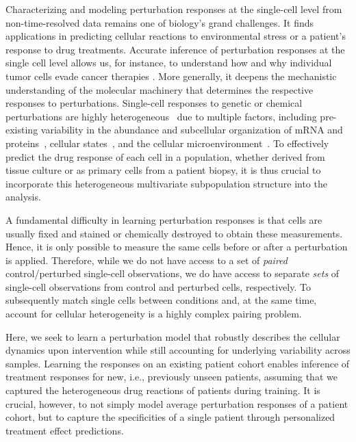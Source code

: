 Characterizing and modeling perturbation responses at the single-cell level from non-time-resolved data remains one of biology's grand challenges. It finds applications in predicting cellular reactions to environmental stress or a patient's response to drug treatments. Accurate inference of perturbation responses at the single cell level allows us, for instance, to understand how and why individual tumor cells evade cancer therapies \citep{frangieh2021multimodal}. More generally, it deepens the mechanistic understanding of the molecular machinery that determines the respective responses to perturbations. Single-cell responses to genetic or chemical perturbations are  highly heterogeneous~\citep{liberali2014hierarchical} due to multiple factors, including pre-existing variability in the abundance and subcellular organization of mRNA and proteins~\citep{battich2013image, battich2015control, gut2018multiplexed, shaffer2017rare}, cellular states~\citep{kramer2019cellular}, and the cellular microenvironment~\citep{snijder2009population}. To effectively predict the drug response of each cell in a  population, whether derived from tissue culture or as primary cells from a patient biopsy, it is thus crucial to incorporate this heterogeneous multivariate subpopulation structure into the analysis.

 A fundamental difficulty in learning perturbation responses is that cells are usually fixed and stained or chemically destroyed to obtain these measurements. Hence, it is only possible to measure the same cells  before or after a perturbation is applied. 
Therefore, while we do not have access to a set of {\em paired} control/perturbed single-cell observations, we do have access to separate \emph{sets} of single-cell observations from control and perturbed cells, respectively. To subsequently match single cells between conditions and, at the same time, account for cellular heterogeneity is a highly complex pairing problem.

Here, we seek to learn a perturbation model that robustly describes the cellular dynamics upon intervention while still accounting for underlying variability across samples. Learning the responses on an existing patient cohort enables inference of treatment responses for new, i.e., previously unseen patients, assuming that we captured the heterogeneous drug reactions of patients during training.
It is crucial, however, to not simply model average perturbation responses of a patient cohort, but to capture the specificities of a single patient through personalized treatment effect predictions.

